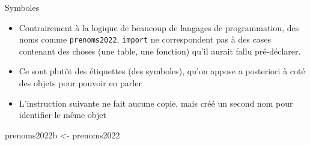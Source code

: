 \documentclass[
  ignorenonframetext,
]{beamer}
\newenvironment{Shaded}{\begin{snugshade}}{\end{snugshade}}
\newcommand{\NormalTok}[1]{#1}
\newcommand{\OtherTok}[1]{\textcolor[rgb]{0.56,0.35,0.01}{#1}}
\providecommand{\tightlist}{%
  \setlength{\itemsep}{0pt}\setlength{\parskip}{0pt}}
\begin{document}
\begin{frame}[fragile]{Symboles}
\protect\hypertarget{symboles}{}
\begin{itemize}
\tightlist
\item
  Contrairement à la logique de beaucoup de langages de programmation,
  des noms comme \texttt{prenoms2022}, \texttt{import} ne correspondent
  pas à des cases contenant des choses (une table, une fonction) qu'il
  aurait fallu pré-déclarer.
\item
  Ce sont plutôt des étiquettes (des symboles), qu'on appose a
  posteriori à coté des objets pour pouvoir en parler
\item
  L'instruction suivante ne fait aucune copie, mais créé un second nom
  pour identifier le même objet
\end{itemize}

\tiny

\begin{Shaded}
\begin{Highlighting}[]
\NormalTok{prenoms2022b }\OtherTok{\textless{}{-}}\NormalTok{ prenoms2022}
\end{Highlighting}
\end{Shaded}

\normalsize
\end{frame}
\end{document}
